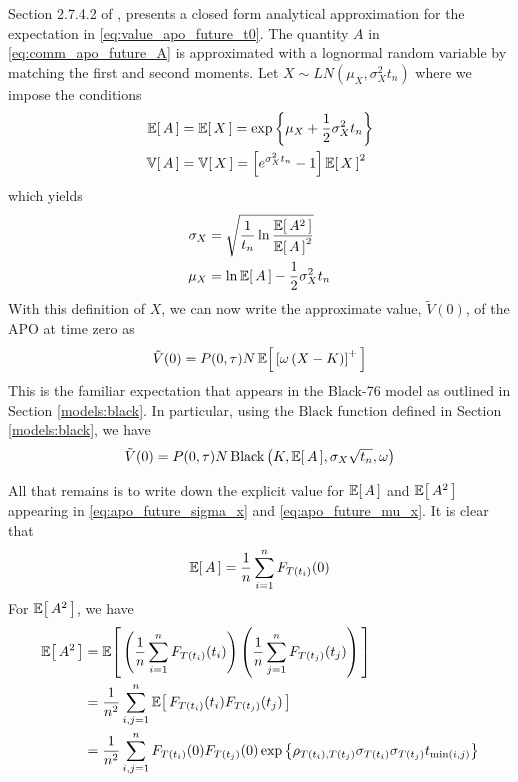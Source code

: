 Section 2.7.4.2 of \cite{Clark_2014}, presents a closed form analytical approximation for the expectation in \eqref{eq:value_apo_future_t0}. The quantity $A$ in \eqref{eq:comm_apo_future_A} is approximated with a lognormal random variable by matching the first and second moments. Let $X \sim LN(\mu_X, \sigma^2_X t_n)$ where we impose the conditions
\begingroup
\addtolength{\jot}{0.5em}
\begin{align}
\Ex{A} &= \Ex{X} = \exp \left\{ \mu_X + \frac{1}{2} \sigma^2_X t_n \right\} \\
\Var{A} &= \Var{X} = \left[ e^{\sigma^2_X t_n} - 1 \right] \Ex{X}^2
\end{align}
\endgroup
which yields
\begingroup
\addtolength{\jot}{0.5em}
\begin{align}
\sigma_X &= \sqrt{ \frac{1}{t_n} \ln \frac{\Ex{A^2}}{\Ex{A}^2} } \label{eq:apo_future_sigma_x} \\
\mu_X &= \ln \Ex{A} - \frac{1}{2} \sigma^2_X t_n \label{eq:apo_future_mu_x}
\end{align}
\endgroup
With this definition of $X$, we can now write the approximate value, $\tilde{V}(0)$, of the APO at time zero as
\begin{equation}
\tilde{V}(0) = P(0, \tau) N \Ex{ \left[ \omega \left( X - K \right) \right]^{+} }
\end{equation}
This is the familiar expectation that appears in the Black-76 model as outlined in Section \ref{models:black}. In particular, using the $\text{Black}$ function defined in Section \ref{models:black}, we have
\begin{equation}
\tilde{V}(0) = P(0, \tau) N \, \text{Black} \left( K, \Ex{A}, \sigma_X \sqrt{t_n}, \omega \right)
\end{equation}

All that remains is to write down the explicit value for $\Ex{A}$ and $\Ex{A^2}$ appearing in \eqref{eq:apo_future_sigma_x} and \eqref{eq:apo_future_mu_x}. It is clear that
\begin{equation}
\Ex{A} = \frac{1}{n} \sum_{i=1}^{n} F_{T(t_{i})}(0)
\end{equation}
For $\Ex{A^2}$, we have
\begin{equation}
\begin{split}
\Ex{A^2} &= \Ex{ \left( \frac{1}{n} \sum_{i=1}^{n} F_{T(t_{i})}(t_{i}) \right) \left( \frac{1}{n} \sum_{j=1}^{n} F_{T(t_{j})}(t_{j}) \right) } \\
         &= \frac{1}{n^2} \sum_{i,j=1}^{n} \Ex{ F_{T(t_{i})}(t_{i}) F_{T(t_{j})}(t_{j}) } \\
         &= \frac{1}{n^2} \sum_{i,j=1}^{n} F_{T(t_{i})}(0) F_{T(t_{j})}(0) \exp \left\{ \rho_{T(t_i), T(t_j)} \sigma_{T(t_i)} \sigma_{T(t_j)} t_{\min(i,j)} \right\}
\end{split}
\end{equation}

